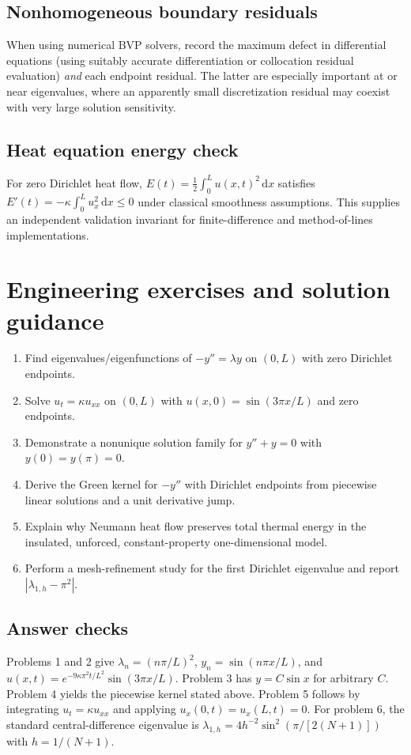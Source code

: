 \documentclass[11pt,letterpaper,oneside]{report}
\theoremstyle{definition}\newtheorem{definition}[theorem]{Definition}
\theoremstyle{remark}\newtheorem{remark}[theorem]{Remark}
\newcommand{\dd}{\,\mathrm{d}}
\begin{document}
\section{Nonhomogeneous boundary residuals}
When using numerical BVP solvers, record the maximum defect in differential equations (using suitably accurate differentiation or collocation residual evaluation) \emph{and} each endpoint residual. The latter are especially important at or near eigenvalues, where an apparently small discretization residual may coexist with very large solution sensitivity.
\section{Heat equation energy check}
For zero Dirichlet heat flow, $E(t)=\frac12\int_0^L u(x,t)^2\dd x$ satisfies $E'(t)=-\kappa\int_0^L u_x^2\dd x\le0$ under classical smoothness assumptions. This supplies an independent validation invariant for finite-difference and method-of-lines implementations.
\chapter{Engineering exercises and solution guidance}
\begin{enumerate}
\item Find eigenvalues/eigenfunctions of $-y''=\lambda y$ on $(0,L)$ with zero Dirichlet endpoints.
\item Solve $u_t=\kappa u_{xx}$ on $(0,L)$ with $u(x,0)=\sin(3\pi x/L)$ and zero endpoints.
\item Demonstrate a nonunique solution family for $y''+y=0$ with $y(0)=y(\pi)=0$.
\item Derive the Green kernel for $-y''$ with Dirichlet endpoints from piecewise linear solutions and a unit derivative jump.
\item Explain why Neumann heat flow preserves total thermal energy in the insulated, unforced, constant-property one-dimensional model.
\item Perform a mesh-refinement study for the first Dirichlet eigenvalue and report $|\lambda_{1,h}-\pi^2|$.
\end{enumerate}
\section{Answer checks}
Problems 1 and 2 give $\lambda_n=(n\pi/L)^2$, $y_n=\sin(n\pi x/L)$, and $u(x,t)=e^{-9\kappa\pi^2t/L^2}\sin(3\pi x/L)$. Problem 3 has $y=C\sin x$ for arbitrary $C$. Problem 4 yields the piecewise kernel stated above. Problem 5 follows by integrating $u_t=\kappa u_{xx}$ and applying $u_x(0,t)=u_x(L,t)=0$. For problem 6, the standard central-difference eigenvalue is $\lambda_{1,h}=4h^{-2}\sin^2(\pi/[2(N+1)])$ with $h=1/(N+1)$.
\end{document}
